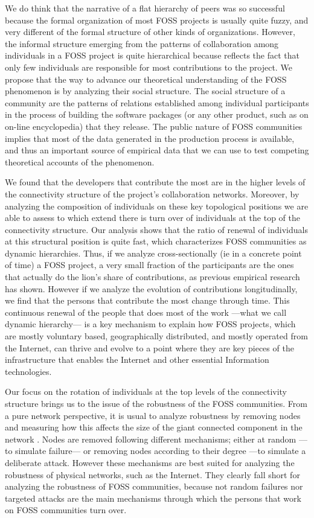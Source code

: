 We do think that the narrative of a flat hierarchy of peers was so successful because the formal organization of most FOSS projects is usually quite fuzzy, and very different of the formal structure of other kinds of organizations. However, the informal structure emerging from the patterns of collaboration among individuals in a FOSS project is quite hierarchical because reflects the fact that only few individuals are responsible for most contributions to the project. We propose that the way to advance our theoretical understanding of the FOSS phenomenon is by analyzing their social structure. The social structure of a community are the patterns of relations established among individual participants in the process of building the software packages (or any other product, such as on on-line encyclopedia) that they release. The public nature of FOSS communities implies that most of the data generated in the production process is available, and thus an important source of empirical data that we can use to test competing theoretical accounts of the phenomenon. 

We found that the developers that contribute the most are in the higher levels of the connectivity structure of the project's collaboration networks. Moreover, by analyzing the composition of individuals on these key topological positions we are able to assess to which extend there is turn over of individuals at the top of the connectivity structure. Our analysis shows that the ratio of renewal of individuals at this structural position is quite fast, which characterizes FOSS communities as dynamic hierarchies. Thus, if we analyze cross-sectionally (ie in a concrete point of time) a FOSS project, a very small fraction of the participants are the ones that actually do the lion's share of contributions, as previous empirical research has shown. However if we analyze the evolution of contributions longitudinally, we find that the persons that contribute the most change through time. This continuous renewal of the people that does most of the work ---what we call dynamic hierarchy--- is a key mechanism to explain how FOSS projects, which are mostly voluntary based, geographically distributed, and mostly operated from the Internet, can thrive and evolve to a point where they are key pieces of the infrastructure that enables the Internet and other essential Information technologies.

Our focus on the rotation of individuals at the top levels of the connectivity structure brings us to the issue of the robustness of the FOSS communities. From a pure network perspective, it is usual to analyze robustness by removing nodes and measuring how this affects the size of the giant connected component in the network \citep{albert:2000}. Nodes are removed following different mechanisms; either at random ---to simulate failure--- or removing nodes according to their degree ---to simulate a deliberate attack. However these mechanisms are best suited for analyzing the robustness of physical networks, such as the Internet. They clearly fall short for analyzing the robustness of FOSS communities, because not random failures nor targeted attacks are the main mechanisms through which the persons that work on FOSS communities turn over.

